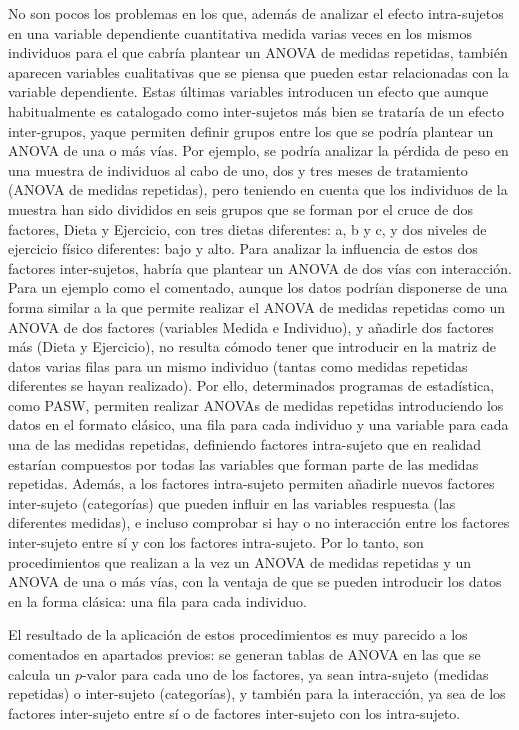 \documentclass[
  a4paper,
]{scrreport}
\theoremstyle{plain}
\theoremstyle{definition}
\theoremstyle{definition}
\theoremstyle{remark}
\begin{document}
No son pocos los problemas en los que, además de analizar el efecto
intra-sujetos en una variable dependiente cuantitativa medida varias
veces en los mismos individuos para el que cabría plantear un ANOVA de
medidas repetidas, también aparecen variables cualitativas que se piensa
que pueden estar relacionadas con la variable dependiente. Estas últimas
variables introducen un efecto que aunque habitualmente es catalogado
como inter-sujetos más bien se trataría de un efecto inter-grupos, yaque
permiten definir grupos entre los que se podría plantear un ANOVA de una
o más vías. Por ejemplo, se podría analizar la pérdida de peso en una
muestra de individuos al cabo de uno, dos y tres meses de tratamiento
(ANOVA de medidas repetidas), pero teniendo en cuenta que los individuos
de la muestra han sido divididos en seis grupos que se forman por el
cruce de dos factores, Dieta y Ejercicio, con tres dietas diferentes: a,
b y c, y dos niveles de ejercicio físico diferentes: bajo y alto. Para
analizar la influencia de estos dos factores inter-sujetos, habría que
plantear un ANOVA de dos vías con interacción. Para un ejemplo como el
comentado, aunque los datos podrían disponerse de una forma similar a la
que permite realizar el ANOVA de medidas repetidas como un ANOVA de dos
factores (variables Medida e Individuo), y añadirle dos factores más
(Dieta y Ejercicio), no resulta cómodo tener que introducir en la matriz
de datos varias filas para un mismo individuo (tantas como medidas
repetidas diferentes se hayan realizado). Por ello, determinados
programas de estadística, como PASW, permiten realizar ANOVAs de medidas
repetidas introduciendo los datos en el formato clásico, una fila para
cada individuo y una variable para cada una de las medidas repetidas,
definiendo factores intra-sujeto que en realidad estarían compuestos por
todas las variables que forman parte de las medidas repetidas. Además, a
los factores intra-sujeto permiten añadirle nuevos factores inter-sujeto
(categorías) que pueden influir en las variables respuesta (las
diferentes medidas), e incluso comprobar si hay o no interacción entre
los factores inter-sujeto entre sí y con los factores intra-sujeto. Por
lo tanto, son procedimientos que realizan a la vez un ANOVA de medidas
repetidas y un ANOVA de una o más vías, con la ventaja de que se pueden
introducir los datos en la forma clásica: una fila para cada individuo.

El resultado de la aplicación de estos procedimientos es muy parecido a
los comentados en apartados previos: se generan tablas de ANOVA en las
que se calcula un \(p\)-valor para cada uno de los factores, ya sean
intra-sujeto (medidas repetidas) o inter-sujeto (categorías), y también
para la interacción, ya sea de los factores inter-sujeto entre sí o de
factores inter-sujeto con los intra-sujeto.
\end{document}
